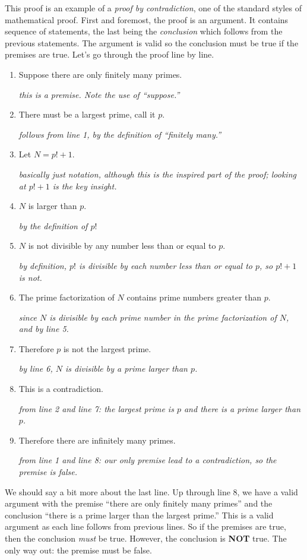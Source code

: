 \documentclass[12pt]{article}
\begin{document}
 This proof is an example of a {\em proof by contradiction}, one of the standard styles of mathematical proof.  First and foremost, the proof is an argument.  It contains sequence of statements, the last being the {\em conclusion} which follows from the previous statements.  The argument is valid so the conclusion must be true if the premises are true.  Let's go through the proof line by line.
 
 \begin{enumerate}
  \item Suppose there are only finitely many primes.
 
 \hfill{\em this is a premise.  Note the use of ``suppose.''}
 \item  There must be a largest prime, call it $p$. 
 
 \hfill{\em follows from line 1, by the definition of ``finitely many.''}
 \item Let $N = p! + 1$.
 
 \hfill {\em basically just notation, although this is the inspired part of the proof; looking at $p! + 1$ is the key insight.}
 \item $N$ is larger than $p$.
 
 \hfill {\em by the definition of $p!$}
 \item $N$ is not divisible by any number less than or equal to $p$.
 
 \hfill {\em by definition, $p!$ is divisible by each number less than or equal to $p$, so $p! + 1$ is not.}
 \item The prime factorization of $N$ contains prime numbers greater than $p$. 
 
 \hfill {\em since $N$ is divisible by each prime number in the prime factorization of $N$, and by line 5.}
 \item Therefore $p$ is not the largest prime.
 
 \hfill {\em by line 6, $N$ is divisible by a prime larger than $p$.}
 \item This is a contradiction.
 
 \hfill {\em from line 2 and line 7: the largest prime is $p$ and there is a prime larger than $p$.}
 \item Therefore there are infinitely many primes.
 
 \hfill {\em from line 1 and line 8: our only premise lead to a contradiction, so the premise is false.}
 \end{enumerate}
 
 We should say a bit more about the last line.  Up through line 8, we have a valid argument with the premise ``there are only finitely many primes'' and the conclusion ``there is a prime larger than the largest prime.''  This is a valid argument as each line follows from previous lines.  So if the premises are true, then the conclusion \emph{must} be true.  However, the conclusion is \textbf{NOT} true.  The only way out: the premise must be false.  
 
\end{document}
